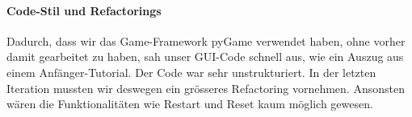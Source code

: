 \paragraph*{Code-Stil und Refactorings}

Dadurch, dass wir das Game-Framework pyGame verwendet haben, ohne vorher damit gearbeitet zu haben, sah unser GUI-Code schnell aus, wie ein Auszug aus einem Anfänger-Tutorial. Der Code war sehr unstrukturiert. In der letzten Iteration mussten wir deswegen ein grösseres Refactoring vornehmen. Ansonsten wären die Funktionalitäten wie Restart und Reset kaum möglich gewesen.